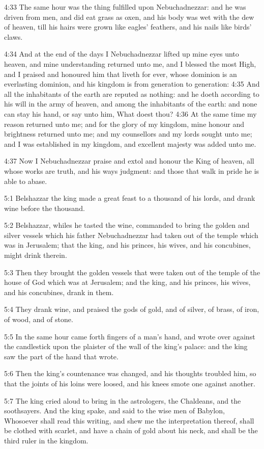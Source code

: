 4:33 The same hour was the thing fulfilled upon Nebuchadnezzar: and he
was driven from men, and did eat grass as oxen, and his body was wet
with the dew of heaven, till his hairs were grown like eagles'
feathers, and his nails like birds' claws.

4:34 And at the end of the days I Nebuchadnezzar lifted up mine eyes
unto heaven, and mine understanding returned unto me, and I blessed
the most High, and I praised and honoured him that liveth for ever,
whose dominion is an everlasting dominion, and his kingdom is from
generation to generation: 4:35 And all the inhabitants of the earth
are reputed as nothing: and he doeth according to his will in the army
of heaven, and among the inhabitants of the earth: and none can stay
his hand, or say unto him, What doest thou?  4:36 At the same time my
reason returned unto me; and for the glory of my kingdom, mine honour
and brightness returned unto me; and my counsellors and my lords
sought unto me; and I was established in my kingdom, and excellent
majesty was added unto me.

4:37 Now I Nebuchadnezzar praise and extol and honour the King of
heaven, all whose works are truth, and his ways judgment: and those
that walk in pride he is able to abase.

5:1 Belshazzar the king made a great feast to a thousand of his lords,
and drank wine before the thousand.

5:2 Belshazzar, whiles he tasted the wine, commanded to bring the
golden and silver vessels which his father Nebuchadnezzar had taken
out of the temple which was in Jerusalem; that the king, and his
princes, his wives, and his concubines, might drink therein.

5:3 Then they brought the golden vessels that were taken out of the
temple of the house of God which was at Jerusalem; and the king, and
his princes, his wives, and his concubines, drank in them.

5:4 They drank wine, and praised the gods of gold, and of silver, of
brass, of iron, of wood, and of stone.

5:5 In the same hour came forth fingers of a man's hand, and wrote
over against the candlestick upon the plaister of the wall of the
king's palace: and the king saw the part of the hand that wrote.

5:6 Then the king's countenance was changed, and his thoughts troubled
him, so that the joints of his loins were loosed, and his knees smote
one against another.

5:7 The king cried aloud to bring in the astrologers, the Chaldeans,
and the soothsayers. And the king spake, and said to the wise men of
Babylon, Whosoever shall read this writing, and shew me the
interpretation thereof, shall be clothed with scarlet, and have a
chain of gold about his neck, and shall be the third ruler in the
kingdom.

